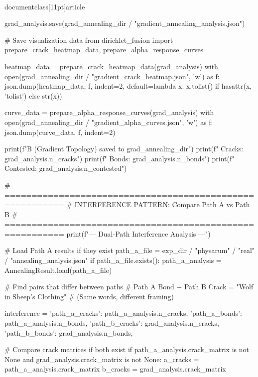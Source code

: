 \\documentclass[11pt]{article}
\begin{document}
\begin{CodeBlock}
                grad_analysis.save(grad_annealing_dir / "gradient_annealing_analysis.json")
                
                # Save visualization data
                from dirichlet_fusion import prepare_crack_heatmap_data, prepare_alpha_response_curves

                heatmap_data = prepare_crack_heatmap_data(grad_analysis)
                with open(grad_annealing_dir / "gradient_crack_heatmap.json", 'w') as f:
                    json.dump(heatmap_data, f, indent=2, default=lambda x: x.tolist() if hasattr(x, 'tolist') else str(x))

                curve_data = prepare_alpha_response_curves(grad_analysis)
                with open(grad_annealing_dir / "gradient_alpha_curves.json", 'w') as f:
                    json.dump(curve_data, f, indent=2)

                print(f"\nPath B (Gradient Topology) saved to {grad_annealing_dir}")
                print(f"  Cracks: {grad_analysis.n_cracks}")
                print(f"  Bonds: {grad_analysis.n_bonds}")
                print(f"  Contested: {grad_analysis.n_contested}")
                
                # =========================================================
                # INTERFERENCE PATTERN: Compare Path A vs Path B
                # =========================================================
                print(f"\n--- Dual-Path Interference Analysis ---")
                
                # Load Path A results if they exist
                path_a_file = exp_dir / "physarum" / "real" / "annealing_analysis.json"
                if path_a_file.exists():
                    path_a_analysis = AnnealingResult.load(path_a_file)
                    
                    # Find pairs that differ between paths
                    # Path A Bond + Path B Crack = "Wolf in Sheep's Clothing"
                    # (Same words, different framing)
                    
                    interference = {
                        'path_a_cracks': path_a_analysis.n_cracks,
                        'path_a_bonds': path_a_analysis.n_bonds,
                        'path_b_cracks': grad_analysis.n_cracks,
                        'path_b_bonds': grad_analysis.n_bonds,
                    }
                    
                    # Compare crack matrices if both exist
                    if path_a_analysis.crack_matrix is not None and grad_analysis.crack_matrix is not None:
                        a_cracks = path_a_analysis.crack_matrix
                        b_cracks = grad_analysis.crack_matrix
                        

\end{CodeBlock}
\end{document}
